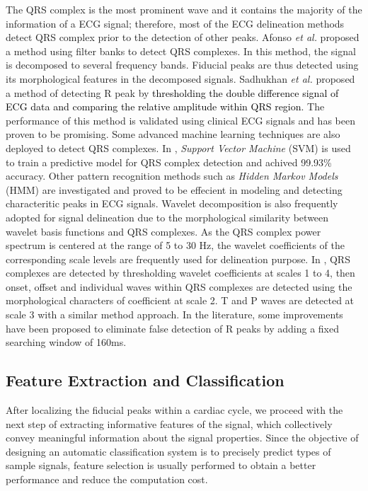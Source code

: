 The QRS complex is the most prominent wave and it contains the majority of the information of a ECG signal; therefore, most of the ECG delineation methods detect QRS complex prior to the detection of other peaks. Afonso \textit{et al.} proposed a method using filter banks to detect QRS complexes\cite{afonso1999ecg}. In this method, the signal is decomposed to several frequency bands. Fiducial peaks are thus detected using its morphological features in the decomposed signals. Sadhukhan \textit{et al.} proposed a method of detecting R peak by \textcolor{black}{thresholding the double difference signal of ECG data and comparing the relative amplitude within QRS region\cite{sadhukhan2012r}}. The performance of this method is validated using clinical ECG signals and has been proven to be promising. Some advanced machine learning techniques are also deployed to detect QRS complexes. In \cite{mehta2008svm}, \textit{Support Vector Machine} (SVM) is used to train a predictive model for QRS complex detection and achived 99.93\% accuracy. Other pattern recognition methods such as \textit{Hidden Markov Models} (HMM) are investigated and proved to be effecient in modeling and detecting characteritic peaks in ECG signals\cite{andreao2006ecg}. Wavelet decomposition is also frequently adopted for signal delineation due to the morphological similarity between wavelet basis functions and QRS complexes. As the QRS complex power spectrum is centered at the range of 5 to 30 Hz, the wavelet coefficients of the corresponding scale levels are frequently used for delineation purpose. In \cite{martinez2004wavelet}, QRS complexes are detected by thresholding wavelet coefficients at scales 1 to 4, then onset, offset and individual waves within QRS complexes are detected using the morphological characters of coefficient at scale 2. T and P waves are detected at scale 3 with a similar method approach. In the literature, some improvements have been proposed to eliminate false detection of R peaks by adding a fixed searching window of 160ms\cite{banerjee2012delineation}. 

\subsection{Feature Extraction and Classification}

After localizing the fiducial peaks within a cardiac cycle, we proceed with the next step of extracting informative features of the signal, which collectively convey meaningful information about the signal properties. %
Since the objective of designing an automatic classification system is to precisely predict types of sample signals, feature selection is usually performed to obtain a better performance and reduce the computation cost\cite{lagerholm2000clustering, prasad2003classification, autofs, ceylan2009novel, osowski2004support}. 

